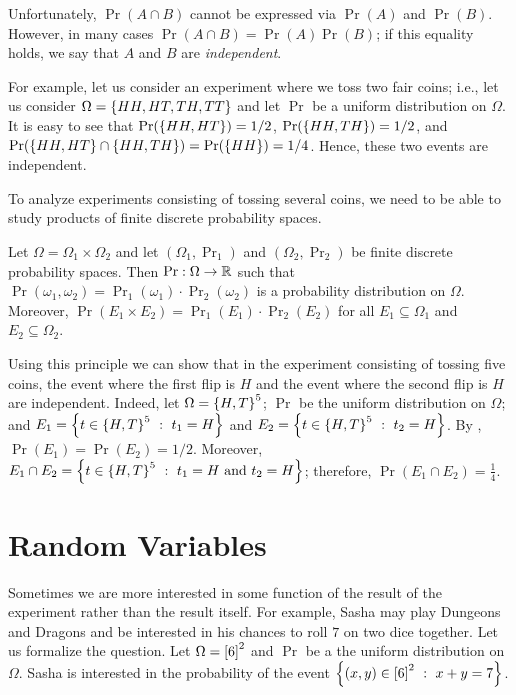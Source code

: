 Unfortunately, $\Pr(A \cap B)$ cannot be expressed via $\Pr(A)$ and $\Pr(B)$.
However, in many cases $\Pr(A \cap B) = \Pr(A) \Pr(B)$; if this equality holds,
we say that $A$ and $B$ are \emph{independent}.

For example, let us consider an experiment where we toss two fair coins; i.e.,
let us consider $\Omega = \set{HH, HT, TH, TT}$ and let $\Pr$ be a uniform
distribution on $\Omega$. It is easy to see that $\Pr(\set{HH, HT}) = 1 / 2$,
$\Pr(\set{HH, TH}) = 1 / 2$, and $\Pr(\set{HH, HT} \cap \set{HH, TH}) =
\Pr(\set{HH}) =  1 / 4$. Hence, these two events are independent.

To analyze experiments consisting of tossing several coins, we need to be able
to study products of finite discrete probability spaces.
\begin{theorem}
\label{theorem:multiplicative-principle-probability}
  Let $\Omega = \Omega_1 \times \Omega_2$ and let $(\Omega_1, \Pr_1)$ and
  $(\Omega_2, \Pr_2)$ be finite discrete probability spaces. Then $\Pr : \Omega
  \to {\mathbb{R}}$ such that $\Pr(\omega_1, \omega_2) = \Pr_1(\omega_1) \cdot
  \Pr_2(\omega_2)$ is a probability distribution on $\Omega$.
  Moreover, $\Pr(E_1 \times E_2) = \Pr_1(E_1) \cdot \Pr_2(E_2)$ for all 
  $E_1 \subseteq \Omega_1$ and $E_2 \subseteq \Omega_2$.
\end{theorem}

Using this principle we can show that in the experiment consisting of tossing
five coins, the event where the first flip is $H$ and the event where the second
flip is $H$ are independent. Indeed, let $\Omega = \set{H, T}^5$; 
$\Pr$ be the uniform distribution on $\Omega$; and 
$E_1 = \set[t_1 = H]{t \in \set{H, T}^5}$ and
$E_2 = \set[t_2 = H]{t \in \set{H, T}^5}$. By
,
$\Pr(E_1) = \Pr(E_2) = 1 / 2$. Moreover, 
$E_1 \cap E_2 = \set[t_1 = H \text{ and } t_2 = H]{t \in \set{H, T}^5}$;
therefore, $\Pr(E_1 \cap E_2) = \frac{1}{4}$.

\section{Random Variables}
Sometimes we are more interested in some function of the result of the
experiment rather than the result itself. For example, Sasha may play Dungeons
and Dragons and be interested in his chances to roll $7$ on two dice together.
Let us formalize the question. Let $\Omega = {[{6}]}^2$ and $\Pr$ be a the
uniform distribution on $\Omega$. Sasha is interested in the probability of the
event $\set[x + y = 7]{(x, y) \in \range{6}^2}$.

